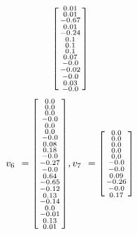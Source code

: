 \documentclass[a4paper,hidelinks,14pt]{extarticle}
\begin{document}
$$\begin{bsmallmatrix}
		0.01\\  
		0.01\\  
		-0.67\\ 
		0.01\\  
		-0.24\\ 
		0.1\\   
		0.1\\   
		0.1\\   
		0.07\\ 
		-0.0\\  
		-0.02\\
		-0.0\\  
		0.03\\  
		-0.0\\  
	\end{bsmallmatrix}
	$$
	$$
	v_{6\phantom{1}}=\begin{bsmallmatrix}
		  0.0\\ 
		0.0\\ 
		0.0\\ 
		-0.0\\
		0.0\\ 
		0.0\\ 
		-0.0\\ 
		0.08\\ 
		0.18\\ 
		-0.0\\
		-0.27\\
		-0.0\\
		0.64\\  
		-0.65\\ 
		-0.12\\ 
		0.13\\
		-0.14\\
		0.0\\
		-0.01\\
		0.13\\ 
		0.01\\ 
	\end{bsmallmatrix},
		v_{7\phantom{1}}=\begin{bsmallmatrix}
		 0.0\\   
		0.0\\   
		0.0\\   
		0.0\\  
		0.0\\   
		-0.0\\  
		-0.0\\  
		0.09\\  
		-0.26\\ 
		-0.0\\ 
		0.17\\ 

\end{bsmallmatrix}$$
\end{document}
